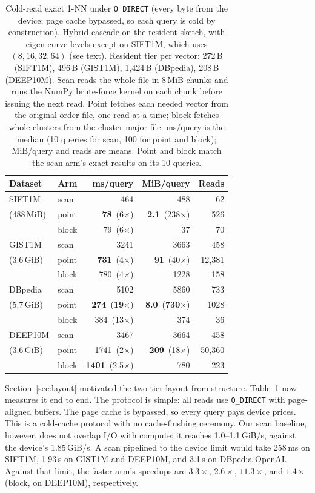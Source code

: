 \documentclass[sigconf, nonacm]{acmart}
\begin{document}
\begin{table}[t]
\caption{Cold-read exact 1-NN under \texttt{O\_DIRECT} (every byte from
the device; page cache bypassed, so each query is cold by construction).
Hybrid cascade on the resident sketch, with eigen-curve levels except on
SIFT1M, which uses $(8,16,32,64)$ (see text). Resident tier per vector: 272\,B (SIFT1M),
496\,B (GIST1M), 1{,}424\,B (DBpedia), 208\,B (DEEP10M). Scan reads the
whole file in 8\,MiB chunks and runs the NumPy brute-force kernel on each
chunk before issuing the next read. Point fetches each needed vector from
the original-order file, one read at a time; block fetches whole clusters
from the cluster-major file. ms/query is the median (10 queries for scan,
100 for point and block); MiB/query and reads are means. Point and block
match the scan arm's exact results on its 10 queries.}
\label{tab:ooc}
\small
\begin{tabular}{@{}llrrr@{}}
\toprule
Dataset & Arm & ms/query & MiB/query & Reads \\
\midrule
SIFT1M       & scan  & 464  & 488  & 62 \\
(488\,MiB)   & point & \textbf{78} \,(6$\times$) & \textbf{2.1} \,(238$\times$) & 526 \\
             & block & 79 \,(6$\times$) & 37 & 70 \\
\midrule
GIST1M       & scan  & 3241 & 3663 & 458 \\
(3.6\,GiB)   & point & \textbf{731} \,(4$\times$) & \textbf{91} \,(40$\times$) & 12{,}381 \\
             & block & 780 \,(4$\times$) & 1228 & 158 \\
\midrule
DBpedia      & scan  & 5102 & 5860 & 733 \\
(5.7\,GiB)   & point & \textbf{274} \,(\textbf{19$\times$}) & \textbf{8.0} \,(\textbf{730$\times$}) & 1028 \\
             & block & 384 \,(13$\times$) & 374 & 36 \\
\midrule
DEEP10M      & scan  & 3467 & 3664 & 458 \\
(3.6\,GiB)   & point & 1741 \,(2$\times$) & \textbf{209} \,(18$\times$) & 50{,}360 \\
             & block & \textbf{1401} \,(2.5$\times$) & 780 & 223 \\
\bottomrule
\end{tabular}
\end{table}

Section~\ref{sec:layout} motivated the two-tier layout from structure.
Table~\ref{tab:ooc} now measures it end to end. The protocol is simple:
all reads use \texttt{O\_DIRECT} with page-aligned buffers. The page
cache is bypassed, so every query pays device prices. This is a
cold-cache protocol with no cache-flushing ceremony. Our scan baseline,
however, does not overlap I/O with compute: it reaches 1.0--1.1\,GiB/s,
against the device's 1.85\,GiB/s. A scan pipelined to the device limit
would take 258\,ms on SIFT1M, 1.93\,s on GIST1M and DEEP10M, and 3.1\,s on
DBpedia-OpenAI. Against that limit, the faster arm's speedups are
$3.3\times$, $2.6\times$, $11.3\times$, and $1.4\times$ (block, on
DEEP10M), respectively.
\end{document}
